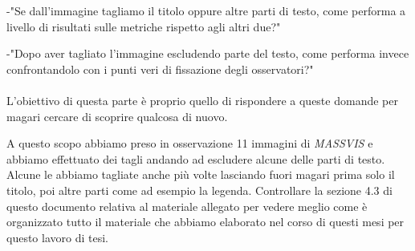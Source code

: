 \documentclass[%
	corpo=12pt,
    twoside,
    stile=classica,
    oldstyle,
    tipotesi=custom,
    greek,
    evenboxes,
]{toptesi}
\begin{document}
{-"Se dall'immagine tagliamo il titolo oppure altre parti di testo, come performa a livello di risultati sulle metriche rispetto agli altri due?"

-"Dopo aver tagliato l'immagine escludendo parte del testo, come performa invece confrontandolo con i punti veri di fissazione degli osservatori?"
\\\\
L'obiettivo di questa parte è proprio quello di rispondere a queste domande per magari cercare di scoprire qualcosa di nuovo. 

A questo scopo abbiamo preso in osservazione 11 immagini di \textit{MASSVIS} e abbiamo effettuato dei tagli andando ad escludere alcune delle parti di testo. Alcune le abbiamo tagliate anche più volte lasciando fuori magari prima solo il titolo, poi altre parti come ad esempio la legenda. Controllare la sezione 4.3 di questo documento relativa al materiale allegato per vedere meglio come è organizzato tutto il materiale che abbiamo elaborato nel corso di questi mesi per questo lavoro di tesi.

}
\end{document}
